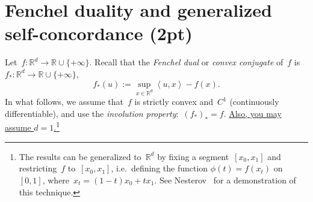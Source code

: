 \documentclass[11pt]{article}
\newcommand{\odima}[1]{{\color{red} #1}}
\newcommand{\R}{\mathds{R}}
\newcommand{\lang}{\left\langle}
\newcommand{\rang}{\right\rangle}
\begin{document}
\section{Fenchel duality and generalized self-concordance (2pt)}
Let~$f: \R^d \to \R \cup \{+\infty\}$. 
Recall that the {\em Fenchel dual} or {\em convex conjugate} of~$f$ is~$f_*: \R^d \to \R \cup \{+\infty\}$,
\begin{equation}
\label{def:Fenchel-dual}
f_*(u) := \sup_{x \in \R^d} \lang u, x \rang - f(x).
\end{equation}
In what follows, we assume that~$f$ is \odima{strictly} convex \odima{and~$C^1$ (continuously differentiable)}, and use the {\em involution property}:~$(f_*)_* = f$. 
\underline{Also, you may assume $d = 1$.}\footnote{The results can be generalized to~$\R^d$ by fixing a segment~$[x_0, x_1]$ and restricting~$f$ to~$[x_0, x_1]$, i.e.~defining the function
$
\phi(t) = f(x_t)
$
on~$[0,1]$, where~$x_t = (1-t)x_0 + t x_1.$ See Nesterov~\cite{nesterov2013introductory} for a demonstration of this technique.}
\end{document}
